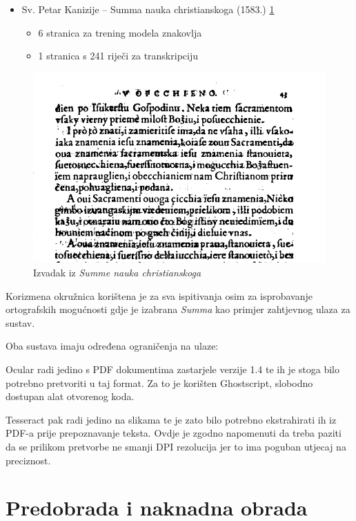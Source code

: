 \documentclass[zavrsnirad]{fer}
\begin{document}
\newpage

\begin{itemize}
	\item Sv. Petar Kanizije – Summa nauka christianskoga (1583.) \ref{slk:summa}
	\begin{itemize}
		\item 6 stranica za trening modela znakovlja
		\item 1 stranica s 241 riječi za transkripciju
	\end{itemize}
\end{itemize}

\begin{figure}[H]
	\centering
	\includegraphics[width=1.0\linewidth]{Figures/summa.png} 
	\caption{Izvadak iz \textit{Summe nauka christianskoga}}
	\label{slk:summa}
\end{figure}

Korizmena okružnica korištena je za sva ispitivanja osim za isprobavanje ortografskih mogućnosti gdje je izabrana \textit{Summa} kao primjer zahtjevnog ulaza za sustav.

Oba sustava imaju određena ograničenja na ulaze: 

Ocular radi jedino s PDF dokumentima zastarjele verzije 1.4 te ih je stoga bilo potrebno pretvoriti u taj format. Za to je korišten Ghostscript, \cite{Ghostscript} slobodno dostupan alat otvorenog koda. 

Tesseract pak radi jedino na slikama te je zato bilo potrebno ekstrahirati ih iz PDF-a prije prepoznavanje teksta. Ovdje je zgodno napomenuti da treba paziti da se prilikom pretvorbe ne smanji DPI rezolucija jer to ima poguban utjecaj na preciznost.

\section{Predobrada i naknadna obrada}
\end{document}
